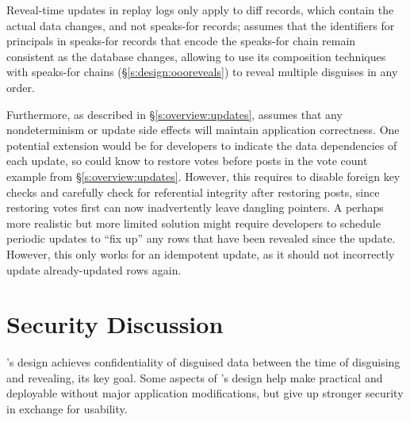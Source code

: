 %
Reveal-time updates in replay logs only apply to diff records, which contain the actual
data changes, and not speaks-for records; \sys assumes that the identifiers for
principals in speaks-for records that encode the speaks-for chain remain
consistent as the database changes, allowing \sys to use its composition
techniques with speaks-for chains (\S\ref{s:design:oooreveals}) to reveal
multiple disguises in any order.
%

%
Furthermore, as described in \S\ref{s:overview:updates}, \sys assumes that
any nondeterminism or update side effects will maintain application
correctness.
%
One potential extension would be for developers to indicate the data dependencies
of each update, so \sys could know to \eg restore votes before posts in the
vote count example from \S\ref{s:overview:updates}. However, this
requires \sys to disable foreign key checks and carefully check for referential
integrity after restoring posts, since restoring votes first can now
inadvertently leave dangling pointers. 
%
A perhaps more realistic but more limited solution might require developers to
schedule periodic updates to ``fix up'' any rows that
have been revealed since the update. However, this only works for an idempotent
update, as it should not incorrectly update already-updated rows again.  
%


\section{Security Discussion}
\label{s:eval-security}


%
%
\sys's design achieves confidentiality of disguised data between the time of
disguising and revealing, its key goal.
%
Some aspects of \sys's design help make \sys practical and deployable without
major application modifications, but give up stronger security in exchange for
usability.
%

